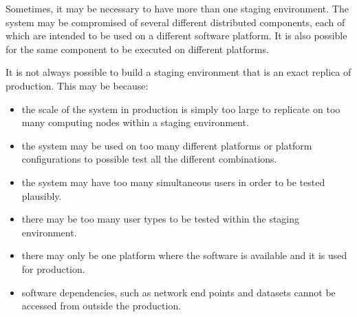 \documentclass[a4paper, openany]{memoir}
\begin{document}
Sometimes, it may be necessary to have more than one staging environment. The system may be compromised of several different distributed components, each of which are intended to be used on a different software platform. It is also possible for the same component to be executed on different platforms.

It is not always possible to build a staging environment that is an exact replica of production. This may be because:
\begin{itemize}
    \item the scale of the system in production is simply too large to replicate on too many computing nodes within a staging environment.
    \item the system may be used on too many different platforms or platform configurations to possible test all the different combinations.
    \item the system may have too many simultaneous users in order to be tested plausibly.
    \item there may be too many user types to be tested within the staging environment.
    \item there may only be one platform where the software is available and it is used for production.
    \item software dependencies, such as network end points and datasets cannot be accessed from outside the production.
\end{itemize}
\end{document}
